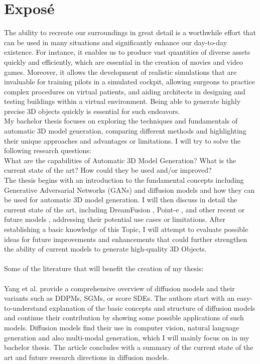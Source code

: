 \chapter{Exposé}
\label{ch:exposé}

The ability to recreate our surroundings in great detail is a worthwhile effort that can be used in many situations and significantly enhance our day-to-day existence. For instance, it enables us to produce vast quantities of diverse assets quickly and efficiently, which are essential in the creation of movies and video games. Moreover, it allows the development of realistic simulations that are invaluable for training pilots in a simulated cockpit, allowing surgeons to practice complex procedures on virtual patients, and aiding architects in designing and testing buildings within a virtual environment. Being able to generate highly precise 3D objects quickly is essential for such endeavors.\\ 
My bachelor thesis focuses on exploring the techniques and fundamentals of automatic 3D model generation, comparing different methods and highlighting their unique approaches and advantages or limitations. I will try to solve the following research questions:\\
What are the capabilities of Automatic 3D Model Generation?
What is the current state of the art?
How could they be used and/or improved?
\\
The thesis begins with an introduction to the fundamental concepts including Generative Adversarial Networks (GANs) \citep{goodfellow2020generative} and diffusion models \citep{yang2022diffusion} and how they can be used for automatic 3D model generation.  I will then discuss in detail the current state of the art, including DreamFusion \citep{poole2022dreamfusion}, Point-e \citep{nichol2022point}, and other recent or future models \citep{xu2022dream3d,lin2022magic3d}, addressing their potential use cases or limitations. After establishing a basic knowledge of this Topic, I will attempt to evaluate possible ideas for future improvements and enhancements that could further strengthen the ability of current models to generate high-quality 3D Objects.\\
\\
Some of the literature that will benefit the creation of my thesis:\\
\textbf{\cite{yang2022diffusion}}\\
Yang et al. provide a comprehensive overview of diffusion models and their variants such as DDPMs, SGMs, or score SDEs. The authors start with an easy-to-understand explanation of the basic concepts and structure of diffusion models and continue their contribution by showing some possible applications of such models. Diffusion models find their use in computer vision, natural language generation and also multi-modal generation, which I will mainly focus on in my bachelor thesis. The article concludes with a summary of the current state of the art and future research directions in diffusion models.\\
